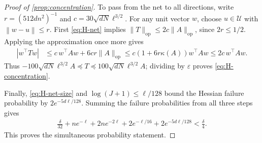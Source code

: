 \documentclass{article}
\newcommand{\op}{\mathrm{op}}
\newcommand{\1}{\mathbf 1}
\newcommand{\eps}{\varepsilon}
\newcommand{\norm}[1]{\left\lVert #1\right\rVert}
\begin{document}
\begin{proof}[Proof of \cref{prop:concentration}]
    To pass from the net to all directions, write
    $r=(512dn^2)^{-1}$ and $c=30\sqrt{dN}\ell^{3/2}$.
    For any unit vector $w$, choose $u\in\mathcal U$ with
    $\norm{w-u}\leq r$. First \eqref{eq:H-net} implies
    $\|T\|_{\op}\leq2c\|A\|_{\op}$, since $2r\leq1/2$.
    Applying the approximation once more gives
    \begin{align}
        |w^\top Tw|
         & \leq c\,w^\top Aw+6cr\|A\|_{\op}
        \leq c(1+6r\kappa(A))w^\top Aw
        \leq2c\,w^\top Aw.
    \end{align}
    Thus $-100\sqrt{dN}\ell^{3/2}A\preceq T
        \preceq100\sqrt{dN}\ell^{3/2}A$; dividing by $\eps$ proves
    \eqref{eq:H-concentration}.

    Finally, \eqref{eq:H-net-size} and $\log(J+1)\leq\ell/128$ bound
    the Hessian failure probability by $2e^{-5d\ell/128}$.
    Summing the failure probabilities from all three steps gives
    \begin{align}
        \frac\delta{32}+ne^{-\ell}+2ne^{-2\ell}
        +2e^{-\ell/16}+2e^{-5d\ell/128}
        <\frac\delta4.
    \end{align}
    This proves the simultaneous probability statement.
\end{proof}
\end{document}
